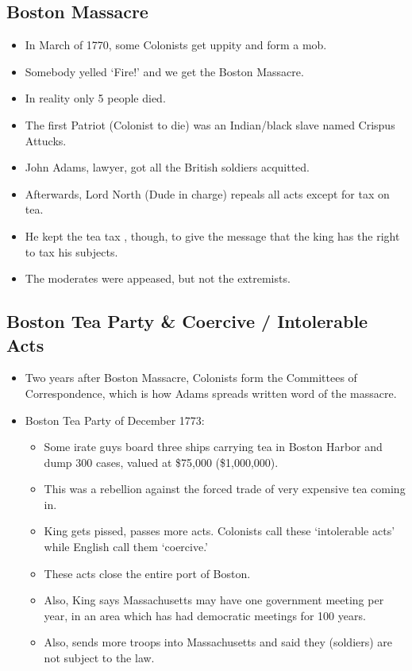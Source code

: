 \documentclass{article}
\begin{document}
    \subsection{Boston Massacre}
      \begin{itemize}
        \item In March of 1770, some Colonists get uppity and form a mob.
        \item Somebody yelled `Fire!' and we get the Boston Massacre.
        \item In reality only 5 people died.
        \item The first Patriot (Colonist to die) was an Indian/black slave named Crispus Attucks.
        \item John Adams, lawyer, got all the British soldiers acquitted.
        \item Afterwards, Lord North (Dude in charge) repeals all acts except for tax on tea.
        \item He kept the tea tax , though, to give the message that the king has the right to tax his subjects.
        \item The moderates were appeased, but not the extremists. 
      \end{itemize}
  

    \subsection{Boston Tea Party \& Coercive / Intolerable Acts}
      \begin{itemize}
        \item Two years after Boston Massacre, Colonists form the Committees of Correspondence, which is how Adams spreads written word of the massacre.
        \item Boston Tea Party of December 1773:
          \begin{itemize}
            \item Some irate guys board three ships carrying tea in Boston Harbor and dump 300 cases, valued at \$75,000 (\$1,000,000).
            \item This was a rebellion against the forced trade of very expensive tea coming in.
            \item King gets pissed, passes more acts. Colonists call these `intolerable acts' while English call them `coercive.'
            \item These acts close the entire port of Boston.
            \item Also, King says Massachusetts may have one government meeting per year, in an area which has had democratic meetings for 100 years.
            \item Also, sends more troops into Massachusetts and said they (soldiers) are not subject to the law.
          \end{itemize}
      \end{itemize}
\end{document}
